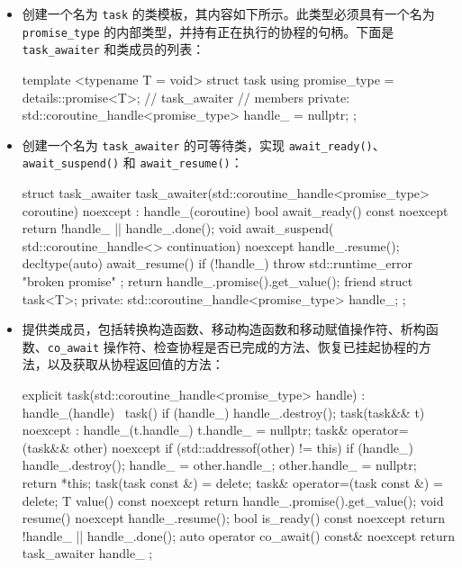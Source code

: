 \begin{itemize}
\item
创建一个名为 \verb|task| 的类模板，其内容如下所示。此类型必须具有一个名为 \verb|promise_type| 的内部类型，并持有正在执行的协程的句柄。下面是 \verb|task_awaiter| 和类成员的列表：

\begin{cpp}
template <typename T = void>
struct task
{
    using promise_type = details::promise<T>;
    // task_awaiter
    // members
private:
    std::coroutine_handle<promise_type> handle_ = nullptr;
};
\end{cpp}

\item
创建一个名为 \verb|task_awaiter| 的可等待类，实现 \verb|await_ready()|、\verb|await_suspend()| 和 \verb|await_resume()|：

\begin{cpp}
struct task_awaiter
{
    task_awaiter(std::coroutine_handle<promise_type> coroutine)
    noexcept
    : handle_(coroutine)
    {}
    bool await_ready() const noexcept
    {
        return !handle_ || handle_.done();
    }
    void await_suspend(
    std::coroutine_handle<> continuation) noexcept
    {
        handle_.resume();
    }
    decltype(auto) await_resume()
    {
        if (!handle_)
        throw std::runtime_error{ "broken promise" };
        return handle_.promise().get_value();
    }
    friend struct task<T>;
private:
    std::coroutine_handle<promise_type> handle_;
};
\end{cpp}

\item
提供类成员，包括转换构造函数、移动构造函数和移动赋值操作符、析构函数、\verb|co_await| 操作符、检查协程是否已完成的方法、恢复已挂起协程的方法，以及获取从协程返回值的方法：

\begin{cpp}
explicit task(std::coroutine_handle<promise_type> handle)
: handle_(handle)
{
}
~task()
{
    if (handle_) handle_.destroy();
}
task(task&& t) noexcept : handle_(t.handle_)
{
    t.handle_ = nullptr;
}
task& operator=(task&& other) noexcept
{
    if (std::addressof(other) != this)
    {
        if (handle_) handle_.destroy();
        handle_ = other.handle_;
        other.handle_ = nullptr;
    }
    return *this;
}
task(task const &) = delete;
task& operator=(task const &) = delete;
T value() const noexcept
{ return handle_.promise().get_value(); }
void resume() noexcept
{ handle_.resume(); }
bool is_ready() const noexcept
{ return !handle_ || handle_.done(); }
auto operator co_await() const& noexcept
{
    return task_awaiter{ handle_ };
}
\end{cpp}


\end{itemize}
